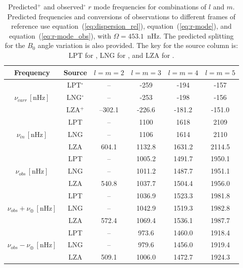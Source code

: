 \begin{table}[ht!]
	\begin{center}
		\caption{Predicted$^+$ and observed$^\circ$ $r$ mode frequencies for combinations of $l$ and $m$. Predicted frequencies and conversions of observations to different frames of reference use equation~(\ref{eq:dispersion_rel}), equation~(\ref{eq:r-mode}), and equation~(\ref{eq:r-mode_obs}), with $\Omega = 453.1$~nHz. The predicted splitting for the $B_0$ angle variation is also provided. The key for the source column is: LPT for \citet{loptien_global-scale_2018}, LNG for \citet{liang_time-distance_2019}, and LZA for \citet{lanza_sectoral_2019}.}\label{tab:r-modes}
		\begin{tabular}{c c c c c c }
			\hline 
			{\bf Frequency } & {\bf Source} & {\boldmath$l=m=2$} & {\boldmath$l=m=3$} & {\boldmath$l=m=4$} & {\boldmath$l=m=5$}  \\ 
			\hline 
			& LPT$^\circ$ & -- & -259 & -194 & -157 \\ 
			$\nu_{carr} \, [\mathrm{nHz}]$ & LNG$^\circ$ & -- & -253 & -198 & -156 \\ 
			& LZA$^+$ & --302.1 & -226.6 & -181.2 & -151.0 \\ 		
			\hline 
			
			& LPT & -- & 1100 & 1618 & 2109 \\ 
			$\nu_{in} \, [\mathrm{nHz}]$  & LNG & -- & 1106 & 1614 & 2110 \\ 
			& LZA & 604.1 & 1132.8 & 1631.2 & 2114.5 \\ 		
			\hline 
			
			& LPT & -- & 1005.2 & 1491.7 & 1950.1 \\
			$\nu_{obs} \, [\mathrm{nHz}]$ & LNG & -- & 1011.2 & 1487.7 & 1951.1 \\
			& LZA & 540.8 & 1037.7 & 1504.4 & 1956.0 \\ 
			\hline 		
			
			& LPT &  -- & 1036.9 & 1523.3 & 1981.8 \\ 
			$\nu_{obs} + \nu_{\oplus} \, [\mathrm{nHz}]$ & LNG & -- & 1042.9 & 1519.3 & 1982.8 \\ 
			& LZA & 572.4 & 1069.4 & 1536.1 & 1987.7 \\ 
			\hline 
			
			& LPT & -- & 973.6 & 1460.0 & 1918.4 \\   
			$\nu_{obs} - \nu_{\oplus} \, [\mathrm{nHz}]$ & LNG & -- & 979.6 & 1456.0 & 1919.4 \\  
			& LZA & 509.1 & 1006.0 & 1472.7 & 1924.3 \\ 
			\hline 
			
		\end{tabular} 
	\end{center}
\end{table}


